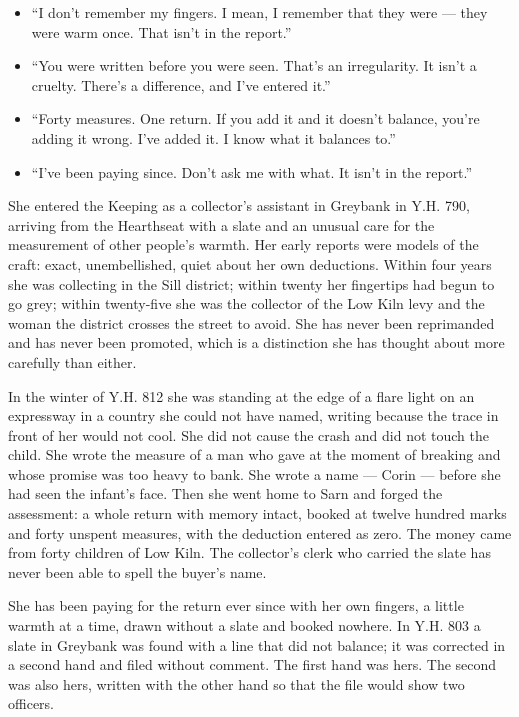 \documentclass{design/chronicle}
\begin{document}
{\begin{itemize}[leftmargin=1.4em,itemsep=1pt,topsep=3pt,parsep=0pt]
\item “I don’t remember my fingers. I mean, I remember that they were — they were warm once. That isn’t in the report.”

\item “You were written before you were seen. That’s an irregularity. It isn’t a cruelty. There’s a difference, and I’ve entered it.”

\item “Forty measures. One return. If you add it and it doesn’t balance, you’re adding it wrong. I’ve added it. I know what it balances to.”

\item “I’ve been paying since. Don’t ask me with what. It isn’t in the report.”

\end{itemize}

She entered the Keeping as a collector’s assistant in Greybank in Y.H. 790, arriving from the Hearthseat with a slate and an unusual care for the measurement of other people’s warmth. Her early reports were models of the craft: exact, unembellished, quiet about her own deductions. Within four years she was collecting in the Sill district; within twenty her fingertips had begun to go grey; within twenty-five she was the collector of the Low Kiln levy and the woman the district crosses the street to avoid. She has never been reprimanded and has never been promoted, which is a distinction she has thought about more carefully than either.

In the winter of Y.H. 812 she was standing at the edge of a flare light on an expressway in a country she could not have named, writing because the trace in front of her would not cool. She did not cause the crash and did not touch the child. She wrote the measure of a man who gave at the moment of breaking and whose promise was too heavy to bank. She wrote a name — Corin — before she had seen the infant’s face. Then she went home to Sarn and forged the assessment: a whole return with memory intact, booked at twelve hundred marks and forty unspent measures, with the deduction entered as zero. The money came from forty children of Low Kiln. The collector’s clerk who carried the slate has never been able to spell the buyer’s name.

She has been paying for the return ever since with her own fingers, a little warmth at a time, drawn without a slate and booked nowhere. In Y.H. 803 a slate in Greybank was found with a line that did not balance; it was corrected in a second hand and filed without comment. The first hand was hers. The second was also hers, written with the other hand so that the file would show two officers.

}
\end{document}
